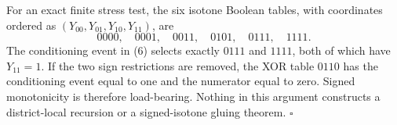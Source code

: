 For an exact finite stress test, the six isotone Boolean tables, with coordinates ordered as \((Y_{00},Y_{01},Y_{10},Y_{11})\), are
\[
 0000,\quad 0001,\quad 0011,\quad 0101,\quad 0111,\quad 1111.
\]
The conditioning event in (6) selects exactly \(0111\) and \(1111\), both of which have \(Y_{11}=1\).  If the two sign restrictions are removed, the XOR table \(0110\) has the conditioning event equal to one and the numerator equal to zero.  Signed monotonicity is therefore load-bearing.  Nothing in this argument constructs a district-local recursion or a signed-isotone gluing theorem. \(\square\)